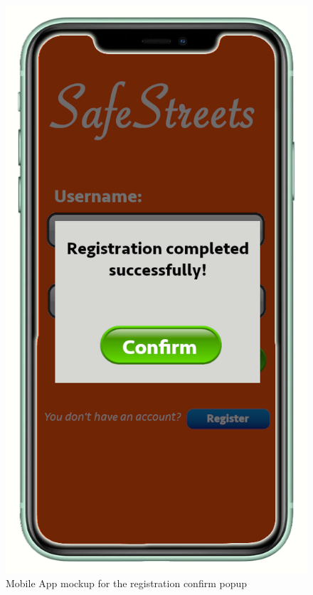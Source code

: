 \documentclass[a4paper]{report}
\begin{document}
{\begin{figure}
\begin{minipage}{.45\textwidth}
\includegraphics[width=.7\linewidth]{mockups/RegistrationConfirm.png}
\caption[Mobile App mockup for the registration confirm]{Mobile App mockup for the registration confirm popup}
\label{fig:register-confirm}
\end{minipage}\hfill
\end{figure}
\begin{figure}
\begin{minipage}{.45\textwidth}
\centering

\end{minipage}
\end{figure}}
\end{document}
